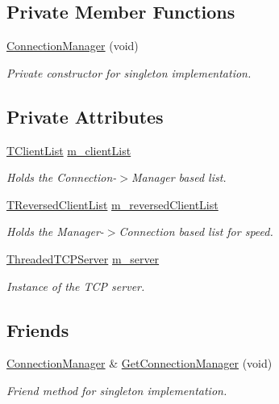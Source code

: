\subsection*{Private Member Functions}
\begin{DoxyCompactItemize}
\item 
\hyperlink{class_connection_manager_a7928f3e95b4e88b01c11eaf3e8089ee7}{Connection\-Manager} (void)
\begin{DoxyCompactList}\small\item\em Private constructor for singleton implementation. \end{DoxyCompactList}\end{DoxyCompactItemize}
\subsection*{Private Attributes}
\begin{DoxyCompactItemize}
\item 
\hyperlink{class_connection_manager_a7b6865543285e3b27b981a739fd0db18}{T\-Client\-List} \hyperlink{class_connection_manager_ad9da7334bc0a1ed0f152f5998b46268a}{m\-\_\-client\-List}
\begin{DoxyCompactList}\small\item\em Holds the Connection-\/$>$Manager based list. \end{DoxyCompactList}\item 
\hyperlink{class_connection_manager_aa35cf836145608197dbe4201b115991c}{T\-Reversed\-Client\-List} \hyperlink{class_connection_manager_aae27a14334d4b84076231534196e75eb}{m\-\_\-reversed\-Client\-List}
\begin{DoxyCompactList}\small\item\em Holds the Manager-\/$>$Connection based list for speed. \end{DoxyCompactList}\item 
\hyperlink{class_threaded_t_c_p_server}{Threaded\-T\-C\-P\-Server} \hyperlink{class_connection_manager_a8858415ddb04364d4697f7ea00aa2977}{m\-\_\-server}
\begin{DoxyCompactList}\small\item\em Instance of the T\-C\-P server. \end{DoxyCompactList}\end{DoxyCompactItemize}
\subsection*{Friends}
\begin{DoxyCompactItemize}
\item 
\hyperlink{class_connection_manager}{Connection\-Manager} \& \hyperlink{class_connection_manager_ab88124ce7a3bf1d2892d0e9763d1af30}{Get\-Connection\-Manager} (void)
\begin{DoxyCompactList}\small\item\em Friend method for singleton implementation. \end{DoxyCompactList}\end{DoxyCompactItemize}


